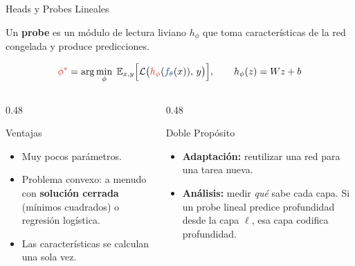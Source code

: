 \documentclass[aspectratio=169, 10pt]{beamer}
\providecommand{\E}{\mathbb{E}}
\newcommand{\ad}[1]{{\color{AdaptRed}#1}}
\newcommand{\fx}[1]{{\color{FixedBlue}#1}}
\newcommand{\formula}[1]{%
	\begin{tcolorbox}[colback=UCMBlue!8, colframe=UCMBlue, arc=4pt,
		boxsep=2pt, left=6pt, right=6pt, top=3pt, bottom=3pt]
		#1
	\end{tcolorbox}
}
\begin{document}
\begin{frame}{Heads y Probes Lineales}

	Un \textbf{probe} es un m\'odulo de lectura liviano $h_\phi$ que toma caracter\'isticas de la red congelada y produce predicciones.

	\formula{
		\[
		\ad{\phi^*} = \arg\min_{\phi} \; \E_{x,y}\Big[\mathcal{L}\big(\ad{h_\phi}(\fx{f_\theta}(x)),\, y\big)\Big], \qquad h_\phi(z) = W z + b
		\]
	}

	\begin{columns}[T]
		\begin{column}{0.48\textwidth}
			\begin{block}{Ventajas}
				\small
				\begin{itemize}
					\item Muy pocos par\'ametros.
					\item Problema convexo: a menudo con \textbf{soluci\'on cerrada} (m\'inimos cuadrados) o regresi\'on log\'istica.
					\item Las caracter\'isticas se calculan una sola vez.
				\end{itemize}
			\end{block}
		\end{column}

		\begin{column}{0.48\textwidth}
			\begin{block}{Doble Prop\'osito}
				\small
				\begin{itemize}
					\item \textbf{Adaptaci\'on:} reutilizar una red para una tarea nueva.
					\item \textbf{An\'alisis:} medir \textit{qu\'e} sabe cada capa. Si un probe lineal predice profundidad desde la capa $\ell$, esa capa codifica profundidad.
				\end{itemize}
			\end{block}
		\end{column}
	\end{columns}

\end{frame}
\end{document}
